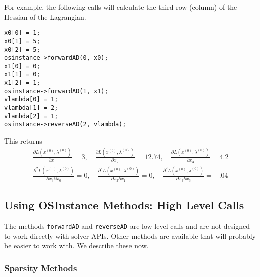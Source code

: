 \documentclass[11pt]{article}
\newcommand{\D}[2]{ \frac{\partial #1}{\partial #2} }
\newcommand{\DD}[3]{ \frac{\partial^2 #1}{\partial #2 \partial #3} }
\renewcommand{\_}{{\char"5F}}
\renewcommand{\{}{{\char"7B}}
\renewcommand{\}}{{\char"7D}}
\renewcommand{\^}{{\char"0D}}
\renewcommand{\'}{{\char"0D}}
\begin{document}
For example, the  following calls will calculate the third row (column) of the Hessian of the Lagrangian.
\begin{verbatim}
x0[0] = 1;
x0[1] = 5; 	
x0[2] = 5; 
osinstance->forwardAD(0, x0);	 
x1[0] = 0;
x1[1] = 0;
x1[2] = 1;
osinstance->forwardAD(1, x1);
vlambda[0] = 1;
vlambda[1] = 2;
vlambda[2] = 1;
osinstance->reverseAD(2, vlambda);
\end{verbatim}
This returns
\begin{eqnarray*}
\D{L (x^{(0)}, \lambda^{(0)})}{x_{1}} = 3, \quad  \D{L (x^{(0)}, \lambda^{(0)})}{x_{2}} = 12.74, \quad  \D{L (x^{(0)}, \lambda^{(0)})}{x_{3}} = 4.2
\end{eqnarray*}
\begin{eqnarray*}
\DD{L(x^{(0)}, \lambda^{(0)})}{x_{3}}{x_{0}} =0, \quad  \DD{L(x^{(0)}, \lambda^{(0)})}{x_{3}}{x_{1}} = 0, \quad   \DD{L(x^{(0)}, \lambda^{(0)})}{x_{3}}{x_{3}} =  -.04
\end{eqnarray*}

\subsection{Using OSInstance Methods: High Level Calls}

The methods {\tt forwardAD} and {\tt reverseAD} are low level calls and are not designed to work directly with solver APIs. Other methods are available that will probably be easier to work with. We describe these now.


\subsubsection{Sparsity Methods}
\end{document}
